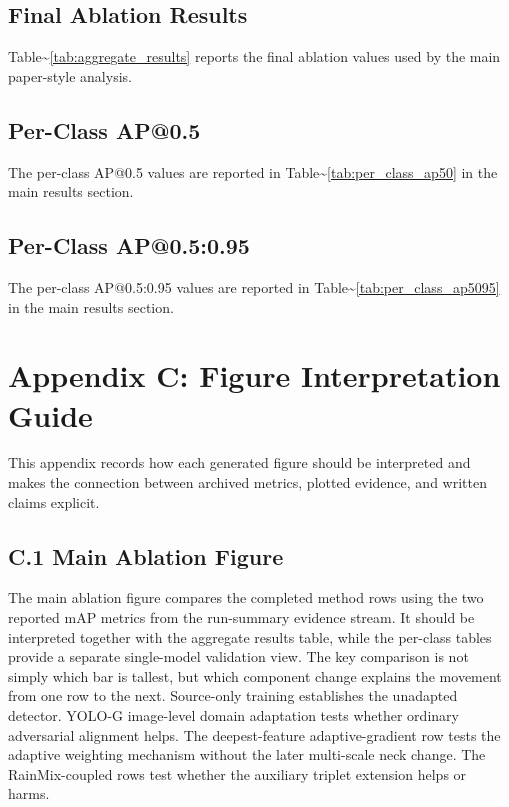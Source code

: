 \documentclass[
  11pt,
]{article}
\begin{document}
\hypertarget{final-ablation-results}{%
\subsection{Final Ablation Results}\label{final-ablation-results}}

Table\textasciitilde{}\ref{tab:aggregate_results} reports the final
ablation values used by the main paper-style analysis.

\hypertarget{per-class-ap0.5}{%
\subsection{Per-Class AP@0.5}\label{per-class-ap0.5}}

The per-class AP@0.5 values are reported in
Table\textasciitilde{}\ref{tab:per_class_ap50} in the main results
section.

\hypertarget{per-class-ap0.50.95}{%
\subsection{Per-Class AP@0.5:0.95}\label{per-class-ap0.50.95}}

The per-class AP@0.5:0.95 values are reported in
Table\textasciitilde{}\ref{tab:per_class_ap5095} in the main results
section.

\hypertarget{appendix-c-figure-interpretation-guide}{%
\section{Appendix C: Figure Interpretation
Guide}\label{appendix-c-figure-interpretation-guide}}

This appendix records how each generated figure should be interpreted
and makes the connection between archived metrics, plotted evidence, and
written claims explicit.

\hypertarget{c.1-main-ablation-figure}{%
\subsection{C.1 Main Ablation Figure}\label{c.1-main-ablation-figure}}

The main ablation figure compares the completed method rows using the
two reported mAP metrics from the run-summary evidence stream. It should
be interpreted together with the aggregate results table, while the
per-class tables provide a separate single-model validation view. The
key comparison is not simply which bar is tallest, but which component
change explains the movement from one row to the next. Source-only
training establishes the unadapted detector. YOLO-G image-level domain
adaptation tests whether ordinary adversarial alignment helps. The
deepest-feature adaptive-gradient row tests the adaptive weighting
mechanism without the later multi-scale neck change. The RainMix-coupled
rows test whether the auxiliary triplet extension helps or harms.
\end{document}
